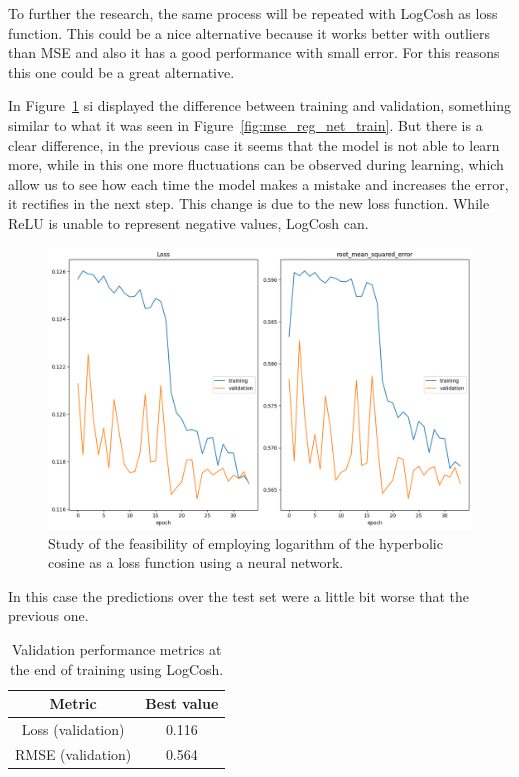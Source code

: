 To further the research, the same process will be repeated with LogCosh as loss function. This could be a nice alternative because it works better with outliers than MSE and also it has a good performance with small error. For this reasons this one could be a great alternative.

In Figure~\ref{fig:logcosh_reg_net_train} si displayed the difference between training and validation, something similar to what it was seen in Figure~\ref{fig:mse_reg_net_train}. But there is a clear difference, in the previous case it seems that the model is not able to learn more, while in this one more fluctuations can be observed during learning, which allow us to see how each time the model makes a mistake and increases the error, it rectifies in the next step. This change is due to the new loss function. While ReLU is unable to represent negative values, LogCosh can. 

\begin{figure}[H]
    \centering
    \includegraphics[width=1\textwidth]{figures/neural_net_regression_research/train_logcosh_net.png}
    \caption{Study of the feasibility of employing logarithm of the hyperbolic cosine as a loss function using a neural network.}
    \label{fig:logcosh_reg_net_train}
\end{figure}

In this case the predictions over the test set were a little bit worse that the previous one. 

\begin{table}[h]
    \centering
    \begin{tabular}{|c|c|}
    \hline
    \textbf{Metric} & \textbf{Best value} \\
    \hline
    Loss (validation) & 0.116 \\
    RMSE (validation) & 0.564 \\
    \hline
    \end{tabular}
    \caption{Validation performance metrics at the end of training using LogCosh.}
    \label{tab:loss-rmse-validation}
\end{table}

